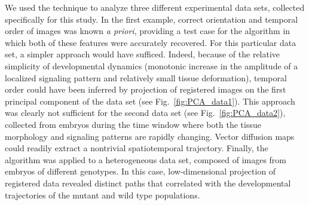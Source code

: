 \documentclass{pnastwo}
\newcommand{\fig}[0]{Fig.}
\begin{document}
\begin{article}
We used the technique to analyze three different experimental data sets, collected specifically for this study. 
%
In the first example, correct orientation and temporal order of images was known {\it a priori}, providing a test case for the algorithm in which both of these features were accurately recovered. 
%
For this particular data set, a simpler approach would have sufficed. 
%
Indeed, because of the relative simplicity of developmental dynamics (monotonic increase in the amplitude of a localized signaling pattern and relatively small tissue deformation), temporal order could have been inferred by projection of registered images on the first principal component of the data set (see \fig~\ref{fig:PCA_data1}). 
%
This approach was clearly not sufficient for the second data set (see \fig~\ref{fig:PCA_data2}), collected from embryos during the time window where both the tissue morphology and signaling patterns are rapidly changing.  
%
Vector diffusion maps could readily extract a nontrivial spatiotemporal trajectory. 
%
Finally, the algorithm was applied to a heterogeneous data set, composed of images from embryos of different genotypes. 
%
In this case, low-dimensional projection of registered data revealed distinct paths that correlated with the developmental trajectories of the mutant and wild type populations. 


\end{article}
\end{document}
